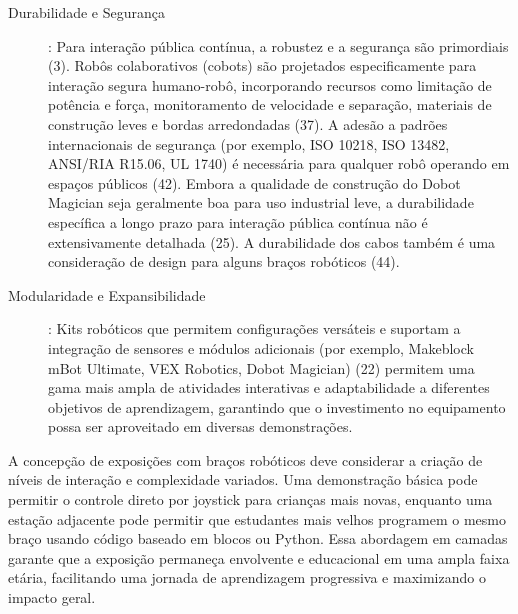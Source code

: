 \documentclass[%
  a4paper,%
  12pt,%
  fleqn,%
  english,%
  brazilian,%
]{article}
\begin{document}
\begin{description}
		\item [Durabilidade e Segurança]: Para interação pública contínua, a robustez e a segurança são primordiais (3). Robôs colaborativos (cobots) são projetados especificamente para interação segura humano-robô, incorporando recursos como limitação de potência e força, monitoramento de velocidade e separação, materiais de construção leves e bordas arredondadas (37). A adesão a padrões internacionais de segurança (por exemplo, ISO 10218, ISO 13482, ANSI/RIA R15.06, UL 1740) é necessária para qualquer robô operando em espaços públicos (42). Embora a qualidade de construção do Dobot Magician seja geralmente boa para uso industrial leve, a durabilidade específica a longo prazo para interação pública contínua não é extensivamente detalhada (25). A durabilidade dos cabos também é uma consideração de design para alguns braços robóticos (44).
		\item [Modularidade e Expansibilidade]: Kits robóticos que permitem configurações versáteis e suportam a integração de sensores e módulos adicionais (por exemplo, Makeblock mBot Ultimate, VEX Robotics, Dobot Magician) (22) permitem uma gama mais ampla de atividades interativas e adaptabilidade a diferentes objetivos de aprendizagem, garantindo que o investimento no equipamento possa ser aproveitado em diversas demonstrações.
	\end{description}


A concepção de exposições com braços robóticos deve considerar a criação de níveis de interação e complexidade variados. Uma demonstração básica pode permitir o controle direto por joystick para crianças mais novas, enquanto uma estação adjacente pode permitir que estudantes mais velhos programem o mesmo braço usando código baseado em blocos ou Python. Essa abordagem em camadas garante que a exposição permaneça envolvente e educacional em uma ampla faixa etária, facilitando uma jornada de aprendizagem progressiva e maximizando o impacto geral.
\end{document}
